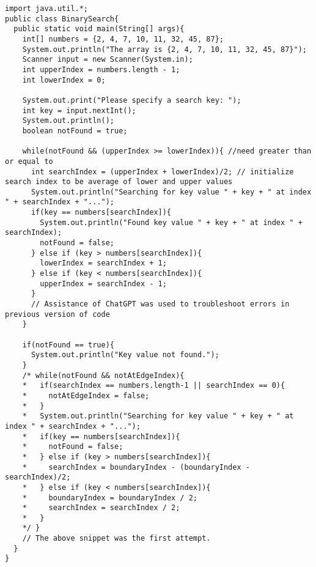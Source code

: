 \documentclass[10pt]{mypackage}
\begin{document}
  \begin{lstlisting}[style=javastyle,title= Binary Search]
import java.util.*;
public class BinarySearch{
  public static void main(String[] args){
    int[] numbers = {2, 4, 7, 10, 11, 32, 45, 87};
    System.out.println("The array is {2, 4, 7, 10, 11, 32, 45, 87}");
    Scanner input = new Scanner(System.in);
    int upperIndex = numbers.length - 1;
    int lowerIndex = 0;

    System.out.print("Please specify a search key: ");
    int key = input.nextInt();
    System.out.println();
    boolean notFound = true;

    while(notFound && (upperIndex >= lowerIndex)){ //need greater than or equal to
      int searchIndex = (upperIndex + lowerIndex)/2; // initialize search index to be average of lower and upper values
      System.out.println("Searching for key value " + key + " at index " + searchIndex + "...");
      if(key == numbers[searchIndex]){
        System.out.println("Found key value " + key + " at index " + searchIndex);
        notFound = false;
      } else if (key > numbers[searchIndex]){
        lowerIndex = searchIndex + 1;
      } else if (key < numbers[searchIndex]){
        upperIndex = searchIndex - 1;
      }
      // Assistance of ChatGPT was used to troubleshoot errors in previous version of code
    }
    
    if(notFound == true){
      System.out.println("Key value not found.");
    }
    /* while(notFound && notAtEdgeIndex){
    *   if(searchIndex == numbers.length-1 || searchIndex == 0){
    *     notAtEdgeIndex = false;
    *   }
    *   System.out.println("Searching for key value " + key + " at index " + searchIndex + "...");
    *   if(key == numbers[searchIndex]){
    *     notFound = false;
    *   } else if (key > numbers[searchIndex]){
    *     searchIndex = boundaryIndex - (boundaryIndex - searchIndex)/2;
    *   } else if (key < numbers[searchIndex]){
    *     boundaryIndex = boundaryIndex / 2;
    *     searchIndex = searchIndex / 2;
    *   }
    */ }
    // The above snippet was the first attempt.
  }
}
  \end{lstlisting}
\end{document}

